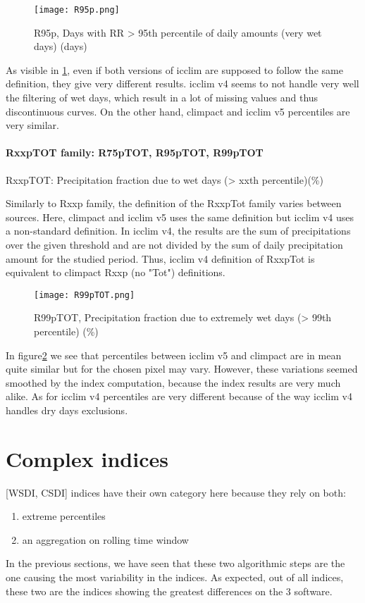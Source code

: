 \documentclass[a4paper,11pt]{article}
\begin{document}
        \begin{figure}
            \centering
            \texttt{[image: R95p.png]}
            \caption{R95p, Days with RR > 95th percentile of daily amounts (very wet days) (days)}
            \label{figure/r95p}
        \end{figure}

        As visible in \ref{figure/r95p}, even if both versions of icclim are supposed to follow the same definition, they give very different results.
        icclim v4 seems to not handle very well the filtering of wet days, which result in a lot of missing values and thus discontinuous curves.
        On the other hand, climpact and icclim v5 percentiles are very similar.

    \subsection{RxxpTOT family: R75pTOT, R95pTOT, R99pTOT}
        RxxpTOT: Precipitation fraction due to wet days (> xxth percentile)(\%)

        Similarly to Rxxp family, the definition of the RxxpTot family varies between sources. 
        Here, climpact and icclim v5 uses the same definition but icclim v4 uses a non-standard definition. 
        In icclim v4, the results are the sum of precipitations over the given threshold and are not divided by the sum of daily precipitation amount for the studied period. 
        Thus, icclim v4 definition of RxxpTot is equivalent to climpact Rxxp (no "Tot") definitions.

        \begin{figure}
            \centering
            \texttt{[image: R99pTOT.png]}
            \caption{R99pTOT, Precipitation fraction due to extremely wet days (> 99th percentile) (\%)}
            \label{figure/r99ptot}
        \end{figure}

        In figure\ref{figure/r99ptot} we see that percentiles between icclim v5 and climpact are in mean quite similar but for the chosen pixel may vary.
        However, these variations seemed smoothed by the index computation, because the index results are very much alike.
        As for icclim v4 percentiles are very different because of the way icclim v4 handles dry days exclusions.  


\part{Complex indices}
    [WSDI, CSDI] indices have their own category here because they rely on both:
    \begin{enumerate}
        \item extreme percentiles
        \item an aggregation on rolling time window
    \end{enumerate}
    In the previous sections, we have seen that these two algorithmic steps are the one causing the most variability in the indices.
    As expected, out of all indices, these two are the indices showing the greatest differences on the 3 software.
\end{document}
